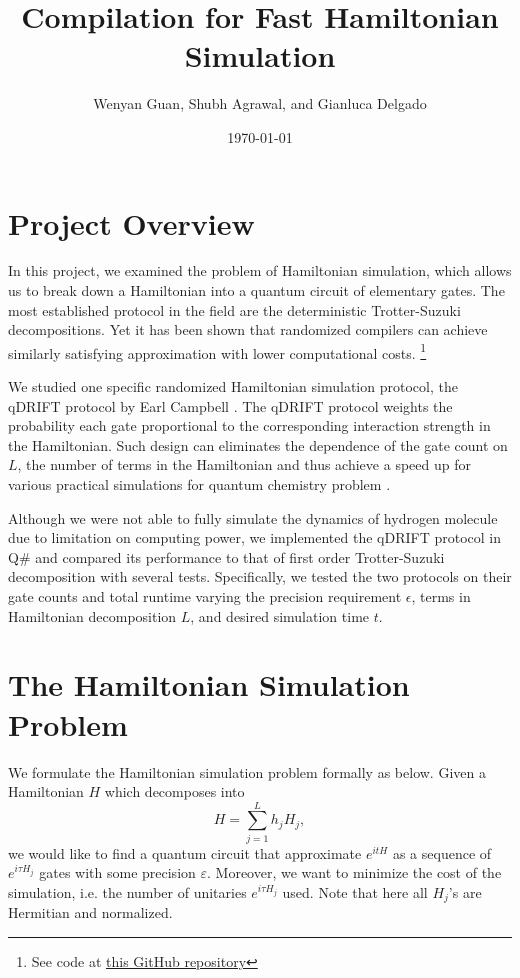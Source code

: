 \documentclass[letterpaper, 11pt]{article}
\begin{document}
\title{Compilation for Fast Hamiltonian Simulation
}

\author{Wenyan Guan, Shubh Agrawal, and Gianluca Delgado}
\date{\today}
\maketitle



\section*{Project Overview}
In this project, we examined the problem of Hamiltonian simulation, which allows us to break down a Hamiltonian into a quantum circuit of elementary gates. The most established protocol in the field are the deterministic Trotter-Suzuki decompositions. Yet it has been shown that randomized compilers can achieve similarly satisfying approximation with lower computational costs.
{\let\thefootnote\relax\footnote{{See code at \href{https://github.com/gianelgado12/cs101-Fast-Hamiltonian-Project}{this GitHub repository}}}}

We studied one specific randomized Hamiltonian simulation protocol, the qDRIFT protocol by Earl Campbell \cite{PhysRevLett.123.070503}. The qDRIFT protocol weights the probability each gate proportional to the corresponding interaction strength in the Hamiltonian. Such design can eliminates the dependence of the gate count on $L$, the number of terms in the Hamiltonian and thus achieve a speed up for various practical simulations for quantum chemistry problem \cite{PhysRevLett.123.070503}.

Although we were not able to fully simulate the dynamics of hydrogen molecule due to limitation on computing power, we implemented the qDRIFT protocol in Q\# and compared its performance to that of first order Trotter-Suzuki decomposition \cite{nathanwiebe2} with several tests. Specifically, we tested the two protocols on their gate counts and total runtime varying the precision requirement $\epsilon$, terms in Hamiltonian decomposition $L$, and desired simulation time $t$.

\section*{The Hamiltonian Simulation Problem}
We formulate the Hamiltonian simulation problem formally as below. Given a Hamiltonian $H$ which decomposes into 
\begin{equation}
    H = \sum_{j = 1}^{L} h_j H_j,
\end{equation}
we would like to find a quantum circuit that approximate $e^{itH}$ as a sequence of $e^{i \tau H_j}$ gates with some precision $\varepsilon$. Moreover, we want to minimize the cost of the simulation, i.e. the number of unitaries $e^{i \tau H_j}$ used. Note that here all $H_j$'s are Hermitian and normalized.
\end{document}
